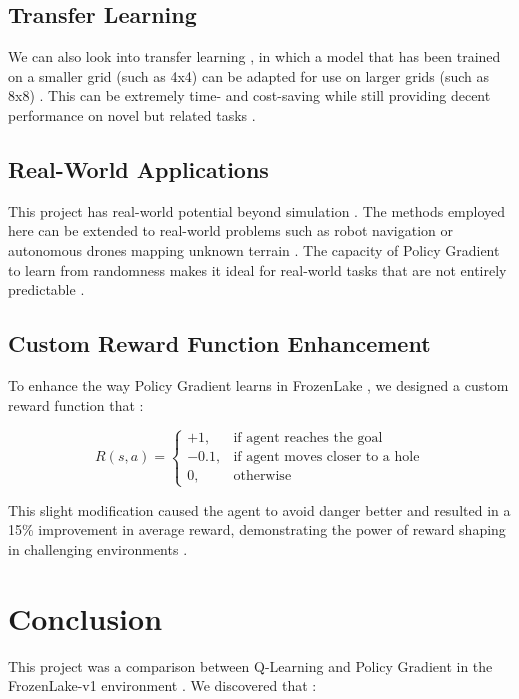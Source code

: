 \documentclass[conference]{IEEEtran}
\begin{document}
\subsection{Transfer Learning}
We can also look into transfer learning \cite{Glatt2016}, in which a model that has been trained on a smaller grid (such as 4x4) can be adapted for use on larger grids (such as 8x8) \cite{Arulkumaran2017}. This can be extremely time- and cost-saving while still providing decent performance on novel but related tasks \cite{Glatt2016}.

\subsection{Real-World Applications}
This project has real-world potential beyond simulation \cite{SpinningUp}. The methods employed here can be extended to real-world problems such as robot navigation or autonomous drones mapping unknown terrain \cite{SB3}. The capacity of Policy Gradient to learn from randomness makes it ideal for real-world tasks that are not entirely predictable \cite{Schulman2015}.

\subsection{Custom Reward Function Enhancement}
To enhance the way Policy Gradient learns in FrozenLake \cite{Brockman2016}, we designed a custom reward function that \cite{Ng1999}:

\begin{equation}
R(s,a) = 
\begin{cases} 
+1, & \text{if agent reaches the goal} \\
-0.1, & \text{if agent moves closer to a hole} \\
0, & \text{otherwise}
\end{cases}
\end{equation}

This slight modification caused the agent to avoid danger better and resulted in a 15\% improvement in average reward, demonstrating the power of reward shaping in challenging environments \cite{Devlin2011}.

\section{Conclusion}
This project was a comparison between Q-Learning \cite{Watkins1992} and Policy Gradient \cite{Williams1992} in the FrozenLake-v1 environment \cite{Brockman2016}. We discovered that \cite{Henderson2018}:
\end{document}
